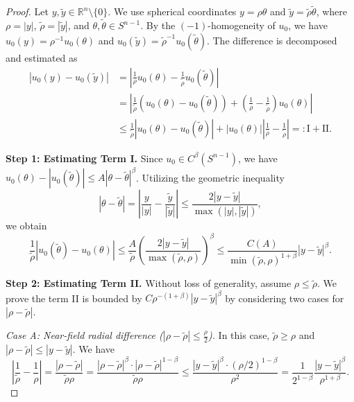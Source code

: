 \documentclass[12pt]{amsart}
\numberwithin{equation}{section}              %
\theoremstyle{remark}
\begin{document}
\begin{proof}
Let $y, \tilde{y} \in \mathbb{R}^n \setminus \{0\}$. We use spherical coordinates $y = \rho \theta$ and $\tilde{y} = \tilde{\rho} \tilde{\theta}$, where $\rho = |y|$, $ \tilde{\rho} = |\tilde{y}|$, and $\theta, \tilde{\theta} \in S^{n-1}$. By the $(-1)$-homogeneity of $u_0$, we have $u_0(y) = \rho^{-1}u_0(\theta)$ and $u_0(\tilde{y} ) = \tilde{\rho} ^{-1}u_0(\tilde{\theta})$. The difference is decomposed and estimated as
\begin{equation*}
    \begin{aligned}
        | u_0(y)-u_0(\tilde{y}) | &= \left| \frac{1}{\rho} u_0(\theta) -\frac{1}{\tilde{\rho} } u_0(\tilde{\theta})   \right| \\
        &= \left| \frac{1}{ \tilde{\rho}} (  u_0(\theta)-u_0(\tilde{\theta})) + \left(   \frac{1}{\rho} -\frac{1}{ \tilde{\rho}} \right) u_0(\theta) \right| \\
        &\leq \frac{1}{ \tilde{\rho}} |  u_0(\theta)-u_0(\tilde{\theta})| + |u_0(\theta)| \left|   \frac{1}{\rho} -\frac{1}{ \tilde{\rho}}\right| =:\textrm{I} + \textrm{II}.
    \end{aligned}
\end{equation*}

\textbf{Step 1: Estimating Term I.}
Since $u_0 \in C^\beta(S^{n-1})$, we have $ u_0(\theta)-|u_0(\tilde{\theta}) | \leq A |  \theta-\tilde{\theta}|^\beta$. Utilizing the geometric inequality 
\begin{equation*}
    \left| \theta -\tilde{\theta} \right| = \left|  \frac{y}{|y|}-\frac{\tilde{y}}{|\tilde{y}|}\right| \leq \frac{2|y-\tilde{y}|}{\max( |y|,|\tilde{y}|)},
\end{equation*}
we obtain
\begin{equation*}
    \frac{1}{\tilde{\rho} } |u_0(\tilde{\theta}) - u_0(\theta)| \leq \frac{A}{ \tilde{\rho}} \left( \frac{2|y-\tilde{y}|}{\max( \tilde{\rho}, \rho)} \right)^\beta \leq \frac{C(A)}{\min( \tilde{\rho}, \rho)^{1+\beta}} |y-\tilde{y}|^\beta.
\end{equation*}

\textbf{Step 2: Estimating Term II.}
Without loss of generality, assume $\rho \leq \tilde{\rho} $. We prove the term II is bounded by $C \rho^{-(1+\beta)}|y-\tilde{y} |^\beta$ by considering two cases for $| \rho-\tilde{\rho}|$.

\textit{Case A: Near-field radial difference ($| \rho-\tilde{\rho}| \leq \frac{\rho}{2}$).}
In this case, $ \tilde{\rho} \geq \rho$ and $| \rho-\tilde{\rho}| \leq |y-\tilde{y} |$. We have 
\begin{equation*}
    \left| \frac{1}{ \tilde{\rho}} - \frac{1}{\rho} \right| = \frac{| \rho-\tilde{\rho}|}{ \tilde{\rho}\rho} = \frac{| \rho-\tilde{\rho}|^\beta \cdot | \rho-\tilde{\rho}|^{1-\beta}}{\tilde{\rho} \rho} \leq \frac{|y-\tilde{y}|^\beta \cdot (\rho/2)^{1-\beta}}{\rho^2} = \frac{1}{2^{1-\beta}} \frac{|y-\tilde{y}|^\beta}{\rho^{1+\beta}}.
\end{equation*}


\end{proof}
\end{document}
